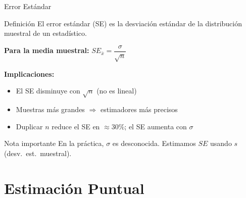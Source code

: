 \documentclass[aspectratio=169,11pt]{beamer}
\begin{document}
\begin{frame}{Error Estándar}
\small
\begin{block}{Definición}
El error estándar (SE) es la desviación estándar de la distribución muestral de un estadístico.
\end{block}

\pause

\textbf{Para la media muestral:} \quad $SE_{\bar{x}} = \dfrac{\sigma}{\sqrt{n}}$

\pause
\vspace{0.2cm}

\textbf{Implicaciones:}
\begin{itemize}\setlength{\itemsep}{0pt}
  \item El SE disminuye con $\sqrt{n}$ (no es lineal)
  \item Muestras más grandes $\Rightarrow$ estimadores más precisos
  \item Duplicar $n$ reduce el SE en $\approx 30\%$; el SE aumenta con $\sigma$
\end{itemize}

\pause
\vspace{0.1cm}

\begin{alertblock}{Nota importante}
En la práctica, $\sigma$ es desconocida. Estimamos $SE$ usando $s$ (desv.\ est.\ muestral).
\end{alertblock}
\end{frame}

\section{Estimación Puntual}
\end{document}
